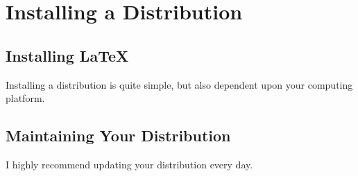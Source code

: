 

\chapter{Installing a Distribution}

\section{Installing \LaTeX}
Installing a distribution is quite simple, but also dependent upon
your computing platform.

\section{Maintaining Your Distribution}
I highly recommend updating your distribution every day.

